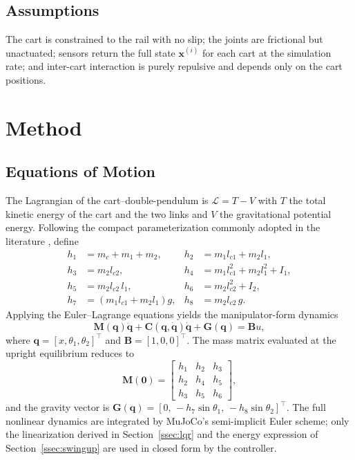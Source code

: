 \documentclass[conference]{IEEEtran}
\begin{document}
\subsection{Assumptions}
The cart is constrained to the rail with no slip; the joints are frictional but unactuated; sensors return the full state $\mathbf{x}^{(i)}$ for each cart at the simulation rate; and inter-cart interaction is purely repulsive and depends only on the cart positions.

\section{Method}\label{sec:method}

\subsection{Equations of Motion}
The Lagrangian of the cart--double-pendulum is $\mathcal{L}=T-V$ with $T$ the total kinetic energy of the cart and the two links and $V$ the gravitational potential energy. Following the compact parameterization commonly adopted in the literature \cite{bounds_apmonitor,tedrake2023underactuated}, define
\begin{align}
h_1 &= m_c+m_1+m_2, &  h_2 &= m_1 l_{c1}+m_2 l_1, \nonumber\\
h_3 &= m_2 l_{c2}, &     h_4 &= m_1 l_{c1}^2+m_2 l_1^2+I_1, \\
h_5 &= m_2 l_{c2}\, l_1, & h_6 &= m_2 l_{c2}^2+I_2, \nonumber\\
h_7 &= (m_1 l_{c1}+m_2 l_1)g, & h_8 &= m_2 l_{c2}\,g. \nonumber
\end{align}
Applying the Euler--Lagrange equations yields the manipulator-form dynamics
\begin{equation}
\mathbf{M}(\mathbf{q})\ddot{\mathbf{q}}+\mathbf{C}(\mathbf{q},\dot{\mathbf{q}})\dot{\mathbf{q}}+\mathbf{G}(\mathbf{q})=\mathbf{B}u,
\label{eq:eom}
\end{equation}
where $\mathbf{q}=[x,\theta_1,\theta_2]^{\!\top}$ and $\mathbf{B}=[1,0,0]^{\!\top}$. The mass matrix evaluated at the upright equilibrium reduces to
\begin{equation}
\mathbf{M}(\mathbf{0})=
\begin{bmatrix}
h_1 & h_2 & h_3 \\
h_2 & h_4 & h_5 \\
h_3 & h_5 & h_6
\end{bmatrix},
\end{equation}
and the gravity vector is $\mathbf{G}(\mathbf{q})=[0,\,-h_7\sin\theta_1,\,-h_8\sin\theta_2]^{\!\top}$. The full nonlinear dynamics are integrated by MuJoCo's semi-implicit Euler scheme; only the linearization derived in Section~\ref{ssec:lqr} and the energy expression of Section~\ref{ssec:swingup} are used in closed form by the controller.
\end{document}
